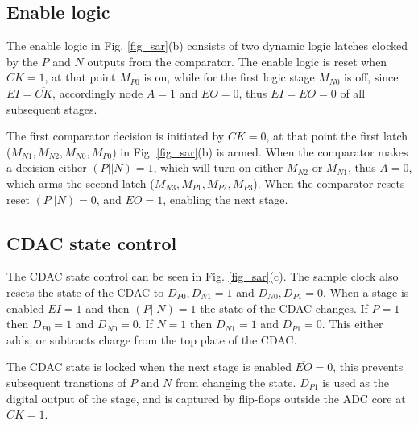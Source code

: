 \subsection{Enable logic}
The enable logic in Fig. \ref{fig_sar}(b) consists of two dynamic logic latches clocked by the $P$ and
$N$ outputs from the comparator. 
The enable logic is reset when $CK = 1$, at that point  $M_{P0}$ is on, while for the
first logic stage $M_{N0}$ is off, since $EI=\overline{CK}$,
accordingly node $A=1$ and $EO=0$, thus $EI=EO=0$ of all
subsequent stages. 

The first comparator decision is initiated by
$CK=0$,  at that point the first latch ($M_{N1},M_{N2},M_{N0},M_{P0}$)
in Fig. \ref{fig_sar}(b) is armed. When the
comparator makes a decision either $(P||N)=1$, which will turn on either
$M_{N2}$ or $M_{N1}$, thus $A=0$, which arms the
second latch ($M_{N3},M_{P1},M_{P2},M_{P3}$). When the comparator
resets reset $(P||N) = 0$, and $EO=1$, enabling the next stage.



\subsection{CDAC state control}
The CDAC state control can be seen in Fig. \ref{fig_sar}(c).  The
sample clock also resets the state of the CDAC to $D_{P0}, D_{N1} = 1$ and
$D_{N0}, D_{P1} = 0$. When a stage is enabled $EI=1$ and then $(P||N)
= 1$  the state of the CDAC changes.  If $P=1$ then $D_{P0}=1$
and $D_{N0}=0$. If $N=1$ then $D_{N1}=1$ and $D_{P1}=0$. This
either adds, or subtracts charge from the top plate of the
CDAC. 

The CDAC state is locked when the next stage is enabled
$\overline{EO}=0$, this prevents subsequent transtions of $P$ and $N$ from
changing the state. $D_{P1}$ is used as the digital output of the stage,
and is captured by flip-flops outside the ADC core at $CK=1$.




